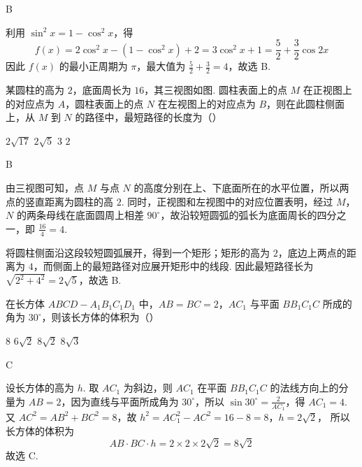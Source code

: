 \begin{answer}
B
\end{answer}

\begin{solution}
利用 \(\sin^2x=1-\cos^2x\)，得
\[
f(x)=2\cos^2x-(1-\cos^2x)+2=3\cos^2x+1=\frac52+\frac32\cos2x
\]
因此 \(f(x)\) 的最小正周期为 \(\pi\)，最大值为 \(\frac52+\frac32=4\)，故选 B.
\end{solution}

\begin{problem}
某圆柱的高为 \(2\)，底面周长为 \(16\)，其三视图如图. 圆柱表面上的点 \(M\) 在正视图上的对应点为 \(A\)，圆柱表面上的点 \(N\) 在左视图上的对应点为 \(B\)，则在此圆柱侧面上，从 \(M\) 到 \(N\) 的路径中，最短路径的长度为（\quad）


\choices
    {\(2\sqrt{17}\)}
    {\(2\sqrt5\)}
    {\(3\)}
    {\(2\)}
\end{problem}

\begin{answer}
B
\end{answer}

\begin{solution}
由三视图可知，点 \(M\) 与点 \(N\) 的高度分别在上、下底面所在的水平位置，所以两点的竖直距离为圆柱的高 \(2\). 同时，正视图和左视图中的对应位置表明，经过 \(M\)，\(N\) 的两条母线在底面圆周上相差 \(90^\circ\)，故沿较短圆弧的弧长为底面周长的四分之一，即 \(\frac{16}{4}=4\).

将圆柱侧面沿这段较短圆弧展开，得到一个矩形；矩形的高为 \(2\)，底边上两点的距离为 \(4\)，而侧面上的最短路径对应展开矩形中的线段. 因此最短路径长为 \(\sqrt{2^2+4^2}=2\sqrt5\)，故选 B.
\end{solution}

\begin{problem}
在长方体 \(ABCD-A_1B_1C_1D_1\) 中，\(AB=BC=2\)，\(AC_1\) 与平面 \(BB_1C_1C\) 所成的角为 \(30^\circ\)，则该长方体的体积为（\quad）

\choices
    {\(8\)}
    {\(6\sqrt2\)}
    {\(8\sqrt2\)}
    {\(8\sqrt3\)}
\end{problem}

\begin{answer}
C
\end{answer}

\begin{solution}
设长方体的高为 \(h\). 取 \(AC_1\) 为斜边，则 \(AC_1\) 在平面 \(BB_1C_1C\) 的法线方向上的分量为 \(AB=2\)，因为直线与平面所成角为 \(30^\circ\)，所以
\(\sin30^\circ=\frac{2}{AC_1}\)，得 \(AC_1=4\). 又 \(AC^2=AB^2+BC^2=8\)，故
\(h^2=AC_1^2-AC^2=16-8=8\)，\(h=2\sqrt2\)，
所以长方体的体积为
\[
AB\cdot BC\cdot h=2\times2\times2\sqrt2=8\sqrt2
\]
故选 C.
\end{solution}

